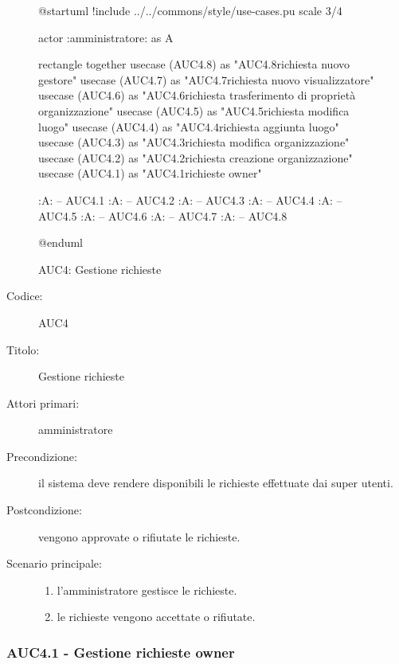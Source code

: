 \documentclass[casi-duso]{subfiles}
\begin{document}
\begin{figure}[h!] 
  \centering 
  \begin{plantuml}
  @startuml
  !include ../../commons/style/use-cases.pu
  scale 3/4

  actor :amministratore: as A

  rectangle {
    together {
      usecase (AUC4.8) as "AUC4.8\nGestione richiesta nuovo gestore"
      usecase (AUC4.7) as "AUC4.7\nGestione richiesta nuovo visualizzatore"
      usecase (AUC4.6) as "AUC4.6\nGestione richiesta trasferimento di proprietà organizzazione"
      usecase (AUC4.5) as "AUC4.5\nGestione richiesta modifica luogo"
      usecase (AUC4.4) as "AUC4.4\nGestione richiesta aggiunta luogo"
      usecase (AUC4.3) as "AUC4.3\nGestione richiesta modifica organizzazione"
      usecase (AUC4.2) as "AUC4.2\nGestione richiesta creazione organizzazione"
      usecase (AUC4.1) as "AUC4.1\nGestione richieste owner"  
    }
  }

  :A: -- AUC4.1
  :A: -- AUC4.2
  :A: -- AUC4.3
  :A: -- AUC4.4
  :A: -- AUC4.5
  :A: -- AUC4.6
  :A: -- AUC4.7
  :A: -- AUC4.8

  @enduml

  \end{plantuml} 
  \caption{AUC4: Gestione richieste} 
  \label{fig:auc4} 
\end{figure}

\begin{description}
  \item[Codice:] AUC4
  \item[Titolo:] Gestione richieste
  \item[Attori primari:] amministratore
  \item[Precondizione:] il sistema deve rendere disponibili le richieste effettuate dai super utenti.
  \item[Postcondizione:] vengono approvate o rifiutate le richieste.
  \item[Scenario principale:] 
  \begin{enumerate}
    \item l'amministratore gestisce le richieste.
    \item le richieste vengono accettate o rifiutate.
  \end{enumerate}
\end{description}

\subsubsection{AUC4.1 - Gestione richieste owner}%
\label{subsub:AUC4.1}
\end{document}
